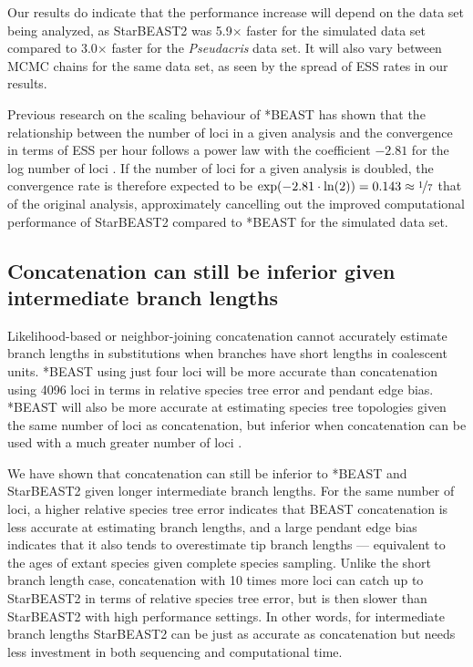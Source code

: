 \documentclass[nogrid]{MBE}%
\begin{document}
Our results do indicate that the performance increase will depend on the
data set being analyzed, as StarBEAST2 was 5.9$\times$ faster for the simulated
data set compared to 3.0$\times$ faster for the \textit{Pseudacris} data set. It
will also vary between MCMC chains for the same data set, as seen by the spread
of ESS rates in our results.

Previous research on the scaling behaviour of *BEAST has shown that the
relationship between the number of loci in a given analysis and the convergence
in terms of ESS per hour follows a power law with the coefficient $-2.81$ for
the log number of loci \citep{Ogilvie01052016}. If the number of loci for a
given analysis is doubled, the convergence rate is therefore
expected to be $\exp(-2.81 \cdot \ln(2)) = 0.143 \approx \nicefrac{1}{7}$ that
of the original analysis, approximately cancelling
out the improved computational performance of StarBEAST2 compared to *BEAST for
the simulated data set.

\subsection{Concatenation can still be inferior given intermediate branch lengths}

Likelihood-based or neighbor-joining concatenation cannot accurately
estimate branch lengths in substitutions when branches have short lengths in coalescent units.
*BEAST using just four loci will be more accurate than
concatenation using 4096 loci in terms in relative species tree error and
pendant edge bias. *BEAST will also be more accurate at estimating species tree
topologies given the same number of loci as concatenation, but inferior when
concatenation can be used with a much greater number of loci
\citep{Ogilvie01052016}.

We have shown that concatenation can still be inferior to *BEAST and StarBEAST2
given longer intermediate branch lengths. For the same number of loci, a higher
relative species tree error indicates that BEAST concatenation is less accurate at
estimating branch lengths, and a large pendant edge bias indicates that
it also tends to overestimate tip branch lengths --- equivalent to the
ages of extant species given complete species sampling. Unlike the short branch
length case, concatenation with 10 times more loci can catch up to StarBEAST2 in
terms of relative species tree error, but is then slower than StarBEAST2 with
high performance settings. In other words, for intermediate branch lengths
StarBEAST2 can be just as accurate as concatenation but needs less investment in
both sequencing and computational time.
\end{document}
